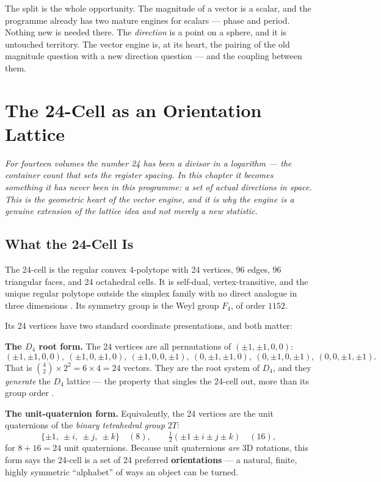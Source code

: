 \documentclass[11pt, letterpaper, openany]{book}
\begin{document}
The split is the whole opportunity. The magnitude of a vector is a scalar, and the programme already
has two mature engines for scalars --- phase and period. Nothing new is needed there. The
\emph{direction} is a point on a sphere, and it is untouched territory. The vector engine is, at its
heart, the pairing of the old magnitude question with a new direction question --- and the coupling
between them.

\chapter{The 24-Cell as an Orientation Lattice}

\begin{center}
\textit{For fourteen volumes the number 24 has been a divisor in a logarithm --- the container count
that sets the register spacing. In this chapter it becomes something it has never been in this
programme: a set of actual directions in space. This is the geometric heart of the vector engine,
and it is why the engine is a genuine extension of the lattice idea and not merely a new statistic.}
\end{center}

\section{What the 24-Cell Is}

The 24-cell is the regular convex 4-polytope with 24 vertices, 96 edges, 96 triangular faces, and 24
octahedral cells. It is self-dual, vertex-transitive, and the unique regular polytope outside the
simplex family with no direct analogue in three dimensions \cite{coxeter1973}. Its symmetry group is
the Weyl group $F_4$, of order $1152$.

Its 24 vertices have two standard coordinate presentations, and both matter:

\begin{geobox}
\textbf{The $D_4$ root form.} The 24 vertices are all permutations of $(\pm 1, \pm 1, 0, 0)$:
\[
(\pm1,\pm1,0,0),\ (\pm1,0,\pm1,0),\ (\pm1,0,0,\pm1),\ (0,\pm1,\pm1,0),\ (0,\pm1,0,\pm1),\ (0,0,\pm1,\pm1).
\]
That is $\binom{4}{2}\times 2^2 = 6\times 4 = 24$ vectors. They are the root system of $D_4$, and they
\emph{generate} the $D_4$ lattice --- the property that singles the 24-cell out, more than its group
order \cite{conwaysloane1999}.

\textbf{The unit-quaternion form.} Equivalently, the 24 vertices are the unit quaternions of the
\emph{binary tetrahedral group} $2T$:
\[
\{\pm1,\ \pm i,\ \pm j,\ \pm k\}\quad(8),\qquad
\tfrac{1}{2}(\pm1\pm i\pm j\pm k)\quad(16),
\]
for $8+16 = 24$ unit quaternions. Because unit quaternions \emph{are} 3D rotations, this form says the
24-cell is a set of 24 preferred \textbf{orientations} --- a natural, finite, highly symmetric
``alphabet'' of ways an object can be turned.
\end{geobox}
\end{document}
